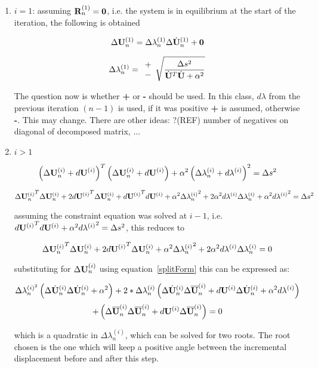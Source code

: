 \begin{enumerate}
\item {\bf $i = 1$}: assuming ${\bf R}_n^{(1)} = {\bf 0}$, i.e. the system is
in equilibrium at the start of the iteration, the following is obtained

\[  \Delta {\bf U}_n^{(1)} = \Delta \lambda_n^{(1)} \Delta \dot{\bf U}_n^{(1)} + {\bf 0} \]

\[ \Delta \lambda_n^{(1)} = \begin{array}{c} + \\ - \end{array}
\sqrt{\frac{\Delta s^2}{\dot{\bf U}^T \dot{\bf U} + \alpha^2}} \]

\noindent The question now is whether {\bf +} or {\bf -} should be
used. In this class, $d \lambda$ from the previous iteration $(n-1)$
is used, if it was positive {\bf +} is assumed, otherwise {\bf -}. This may
change. There are other ideas: ?(REF) number of negatives on diagonal
of decomposed matrix, ...

\item {\bf $i > 1$}

\[ \left( \Delta {\bf U}_n^{(i)} + d{\bf U}^{(i)} \right)^T \left( \Delta {\bf U}_n^{(i)} +
d{\bf U}^{(i)} \right) + \alpha^2 \left( \Delta \lambda_n^{(i)} + d\lambda^{(i)}
\right)^2 = \Delta s^2 \]

\[
\Delta {{\bf U}_n^{(i)}}^T\Delta {\bf U}_n^{(i)} + 2{d{\bf U}^{(i)}}^T\Delta {\bf U}_n^{(i)} + {d{\bf U}^{(i)}}^T d{\bf U}^{(i)}
+ \alpha^2 \Delta {\lambda_n^{(i)}}^2
+ 2 \alpha^2 d\lambda^{(i)} \Delta \lambda_n^{(i)} + \alpha^2 {d\lambda^{(i)}}^2
= \Delta s^2
\]

\noindent assuming the constraint equation was solved at $i-1$,
i.e. ${d{\bf U}^{(i)}}^T d{\bf U}^{(i)} + \alpha^2 {d\lambda^{(i)}}^2 = \Delta s^2$, this reduces to

\[
\Delta {{\bf U}_n^{(i)}}^T\Delta {\bf U}_n^{(i)} + 2{d{\bf U}^{(i)}}^T\Delta {\bf U}_n^{(i)} + 
\alpha^2 \Delta {\lambda_n^{(i)}}^2
+ 2 \alpha^2 d\lambda^{(i)} \Delta \lambda_n^{(i)} 
= 0
\]

\noindent substituting for $\Delta {{\bf U}_n^{(i)}} $ using
equation~\ref{splitForm} this can be expressed as:

\[
\Delta \lambda_n^{(i)^2} \left( \Delta \dot{\bf U}_n^{(i)} \Delta \dot{\bf U}_n^{(i)} +
\alpha^2 \right) +
2* \Delta \lambda_n^{(i)} \left( \Delta \dot{\bf U}_n^{(i)} \Delta \overline{\bf U}_n^{(i)}
+ d{\bf U}^{(i)} \Delta \dot{\bf U}_n^{(i)} 
+ \alpha^2d \lambda^{(i)} \right)
\]
\[
+ \left (\Delta \overline{\bf U}_n^{(i)} \Delta \overline{\bf U}_n^{(i)} + d{\bf U}^{(i)} \Delta
\overline{\bf U}_n^{(i)}
\right) =0 
\]

which is a quadratic in $\Delta \lambda_n^{(i)}$, which can be solved for two roots.
The root chosen is the one which will keep a positive angle between
the incremental displacement before and after this step.


\end{enumerate}
